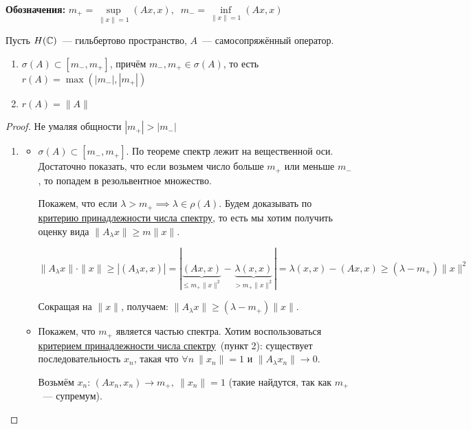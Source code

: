 \bigskip

\noindent
\textbf{Обозначения:} \(m_+=\sup\limits_{\|x\|=1} (Ax, x), \;\; m_-=\inf\limits_{\|x\|=1} (Ax, x)\)


\begin{theorem}[11.5]\label{11.5}
    Пусть $H(\mathbb{C})$~--- гильбертово пространство, 
    $A$~--- самосопряжённый оператор.
    \begin{enumerate}
        \item $\sigma(A) \subset [m_-, m_+]$, 
        причём $m_-, m_+ \in \sigma(A)$, то есть
        $r(A) = \max(|m_-|, |m_+|)$
        \item $r(A)=\|A\|$
    \end{enumerate}
\end{theorem}


\begin{proof}
Не умаляя общности \(|m_+| > |m_-|\)
\begin{enumerate}
    \item
    \begin{itemize}
        \item[а)] $\sigma(A) \subset [m_-, m_+]$. 
        По теореме  спектр лежит на вещественной оси.
        Достаточно показать, что если возьмем число больше $m_+$ или меньше $m_-$, то попадем в резольвентное множество.

        Покажем, что если $\lambda > m_+ \implies \lambda \in \rho(A)$. Будем доказывать по \hyperref[11.3]{критерию принадлежности числа спектру}, то есть мы хотим 
        получить оценку вида $\|A_{\lambda} x\| \geqslant m \|x\|$.

        \[
        \|A_\lambda x \| \cdot \|x\| \geqslant |(A_{\lambda} x, x)| = |\underbrace{(A x, x)}_{\leqslant m_+ \|x\|^2} - \underbrace{\lambda (x, x)}_{> m_+ \|x\|^2}| = 
        \lambda (x, x) - (A x, x) \geqslant (\lambda - m_+) \|x\|^2
        \]

        Сокращая на $\|x\|$, получаем:
        $\|A_{\lambda} x\| \geqslant (\lambda - m_+) \|x\|$.

        \item[б)] Покажем, что $m_+$ является частью спектра. Хотим воспользоваться \hyperref[11.3]{критерием принадлежности числа спектру}\ (пункт 2): существует последовательность $x_n$, такая что $\forall n\: \|x_n\| = 1$ и $\|A_{\lambda} x_n\| \to 0$.

        Возьмём $x_n$: $(A x_n, x_n) \to m_+, \: \|x_n\| = 1$ (такие найдутся, так как $m_+$~--- супремум). 


\end{itemize}
\end{enumerate}
\end{proof}
